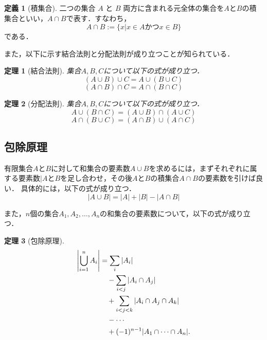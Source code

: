 \documentclass{jsreport}
\theoremstyle{plain} %
\newtheorem{theorem}{定理}
\theoremstyle{definition}
\newtheorem{definition}{定義}
\begin{document}
\begin{definition}[積集合]
    二つの集合 $A$ と $B$ 両方に含まれる元全体の集合を$A$と$B$の積集合といい，$A \cap B$で表す．すなわち，
    \begin{equation}
        A \cap B := \{x | x \in A かつ x \in B \}
    \end{equation}
    である．
\end{definition}

また，以下に示す結合法則と分配法則が成り立つことが知られている．
\begin{theorem}[結合法則]  集合$A, B, C$について以下の式が成り立つ．
    \begin{equation}
        (A \cup B) \cup C = A \cup (B \cup C)
    \end{equation}
    \begin{equation}
        (A \cap B) \cap C = A \cap (B \cap C)
    \end{equation}
\end{theorem}

\begin{theorem}[分配法則] 集合$A, B, C$について以下の式が成り立つ．
    \begin{equation}
        A \cup (B \cap C) = (A \cup B) \cap (A \cup C)
    \end{equation}
    \begin{equation}
        A \cap (B \cup C) = (A \cap B) \cup (A \cap C)
    \end{equation}
\end{theorem}

\subsection{包除原理}
有限集合$A$と$B$に対して和集合の要素数$A \cup B$を求めるには，まずそれぞれに属する要素数$|A$と$B$を足し合わせ，その後$A$と$B$の積集合$A \cap B$の要素数を引けば良い．
具体的には，以下の式が成り立つ．
\begin{equation}
    |A \cup B| = |A| + |B| - |A \cap B|
\end{equation}

また，$n$個の集合$A_1, A_2, \ldots, A_n$の和集合の要素数について，以下の式が成り立つ．
\begin{theorem}[包除原理]
        \begin{align}
        \left| \bigcup_{i=1}^{n} A_i \right|
        &= \sum_i |A_i| \notag \\
        &\quad - \sum_{i < j} |A_i \cap A_j| \notag \\
        &\quad + \sum_{i < j < k} |A_i \cap A_j \cap A_k| \notag \\
        &\quad - \cdots \notag \\
        &\quad + (-1)^{n-1} |A_1 \cap \cdots \cap A_n|.
        \end{align}
\end{theorem}
\end{document}
